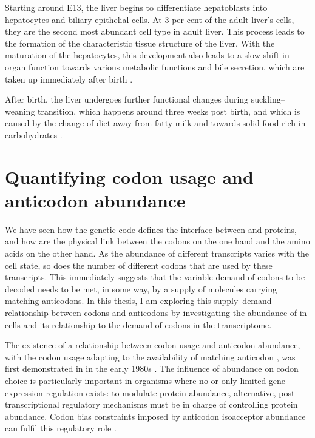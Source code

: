 Starting around E13, the liver begins to differentiate hepatoblasts into
hepatocytes and biliary epithelial cells. At \num{3} per cent of the adult
liver’s cells, they are the second most abundant cell type in adult liver. This
process leads to the formation of the characteristic tissue structure of the
liver. With the maturation of the hepatocytes, this development also leads to a
slow shift in organ function towards various metabolic functions and bile
secretion, which are taken up immediately after birth \citep{Si-Tayeb:2010}.

After birth, the liver undergoes further functional changes during
suckling–weaning transition, which happens around three weeks post birth, and
which is caused by the change of diet away from fatty milk and towards solid
food rich in carbohydrates \citep{Girard:1992}.


\section{Quantifying codon usage and anticodon abundance}

We have seen how the genetic code defines the interface between \mrna and
proteins, and how \trna[s] are the physical link between the codons on the one
hand and the amino acids on the other hand. As the abundance of different \mrna
transcripts varies with the cell state, so does the number of different codons
that are used by these transcripts. This immediately suggests that the variable
demand of codons to be decoded needs to be met, in some way, by a supply of
\trna molecules carrying matching anticodons. In this thesis, I am exploring
this supply--demand relationship between codons and anticodons by investigating
the abundance of \trna[s] in cells and its relationship to the demand of codons
in the \mrna transcriptome.

The existence of a relationship between codon usage and anticodon abundance,
with the codon usage adapting to the availability of matching anticodon
\trna[s], was first demonstrated in  in the early 1980s
\citep{Ikemura:1981,Ikemura:1981a,Ikemura:1985}. The influence of \trna
abundance on codon choice is particularly important in organisms where no or
only limited gene expression regulation exists: to modulate protein abundance,
alternative, post-transcriptional regulatory mechanisms must be in charge of
controlling protein abundance. Codon bias constraints imposed by \trna anticodon
isoacceptor abundance can fulfil this regulatory role \citep{Horn:2008}.

